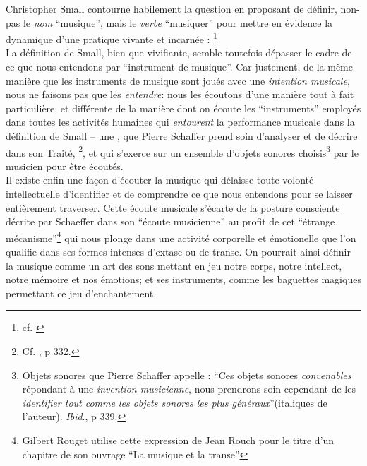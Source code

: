 \indent Christopher Small contourne habilement la question en proposant de définir, non-pas le \textit{nom} ``musique'', mais le \textit{verbe} ``musiquer'' pour mettre en évidence la dynamique d'une pratique vivante et incarnée : \label{def:musicking}\footnote{cf. \cite{small_musicking:_1998}}\\
\indent La définition de Small, bien que vivifiante, semble toutefois dépasser le cadre de ce que nous entendons par ``instrument de musique''. Car justement, de la même manière que les instruments de musique sont joués avec une \textit{intention musicale}, nous ne faisons pas que les \textit{entendre}: nous les écoutons d'une manière tout à fait particulière, et différente de la manière dont on écoute les ``instruments'' employés dans toutes les activités humaines qui \textit{entourent} la performance musicale dans la définition de Small -- une , que Pierre Schaffer prend soin d'analyser et de décrire dans son Traité, \footnote{Cf. \cite{schaeffer_traite_1966}, p 332.}, et qui s'exerce sur un ensemble d'objets sonores choisis\footnote{Objets sonores que Pierre Schaffer appelle : ``Ces objets sonores \textit{convenables} répondant à une \textit{invention musicienne}, nous prendrons soin cependant de les \textit{identifier tout comme les objets sonores les plus généraux}''(italiques de l'auteur). \textit{Ibid}., p 339.} par le musicien pour être écoutés.\\
\indent Il existe enfin une façon d'écouter la musique 
qui délaisse toute volonté intellectuelle d'identifier et de comprendre ce que nous entendons pour se laisser entièrement traverser.
Cette écoute musicale s'écarte de la posture consciente décrite par Schaeffer dans son ``écoute musicienne'' au profit de cet ``étrange mécanisme''\footnote{Gilbert Rouget utilise cette expression de Jean Rouch pour le titre d'un chapitre de son ouvrage ``La musique et la transe''\cite{rouget_musique_1980}} qui nous plonge dans une activité corporelle et émotionelle que l'on qualifie dans ses formes intenses d'extase ou de transe.  On pourrait ainsi définir la musique comme un art des sons mettant en jeu notre corps, notre intellect, notre mémoire et nos émotions; et ses instruments, comme les baguettes magiques permettant ce jeu d'enchantement.

